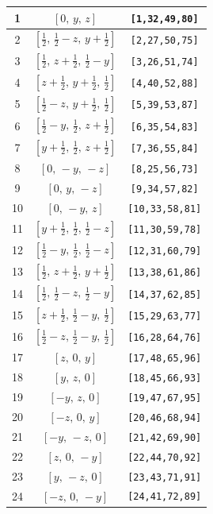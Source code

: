 \documentclass[fleqn,8pt]{jsarticle}
\begin{document}
\begin{longtable}{ccc}
1 & $\left[ 0,\, y,\, z \right]$ & {\tt [1,32,49,80]} \\ \hline
2 & $\left[ \frac{1}{2},\, \frac{1}{2} - z,\, y + \frac{1}{2} \right]$ & {\tt [2,27,50,75]} \\ \hline
3 & $\left[ \frac{1}{2},\, z + \frac{1}{2},\, \frac{1}{2} - y \right]$ & {\tt [3,26,51,74]} \\ \hline
4 & $\left[ z + \frac{1}{2},\, y + \frac{1}{2},\, \frac{1}{2} \right]$ & {\tt [4,40,52,88]} \\ \hline
5 & $\left[ \frac{1}{2} - z,\, y + \frac{1}{2},\, \frac{1}{2} \right]$ & {\tt [5,39,53,87]} \\ \hline
6 & $\left[ \frac{1}{2} - y,\, \frac{1}{2},\, z + \frac{1}{2} \right]$ & {\tt [6,35,54,83]} \\ \hline
7 & $\left[ y + \frac{1}{2},\, \frac{1}{2},\, z + \frac{1}{2} \right]$ & {\tt [7,36,55,84]} \\ \hline
8 & $\left[ 0,\, - y,\, - z \right]$ & {\tt [8,25,56,73]} \\ \hline
9 & $\left[ 0,\, y,\, - z \right]$ & {\tt [9,34,57,82]} \\ \hline
10 & $\left[ 0,\, - y,\, z \right]$ & {\tt [10,33,58,81]} \\ \hline
11 & $\left[ y + \frac{1}{2},\, \frac{1}{2},\, \frac{1}{2} - z \right]$ & {\tt [11,30,59,78]} \\ \hline
12 & $\left[ \frac{1}{2} - y,\, \frac{1}{2},\, \frac{1}{2} - z \right]$ & {\tt [12,31,60,79]} \\ \hline
13 & $\left[ \frac{1}{2},\, z + \frac{1}{2},\, y + \frac{1}{2} \right]$ & {\tt [13,38,61,86]} \\ \hline
14 & $\left[ \frac{1}{2},\, \frac{1}{2} - z,\, \frac{1}{2} - y \right]$ & {\tt [14,37,62,85]} \\ \hline
15 & $\left[ z + \frac{1}{2},\, \frac{1}{2} - y,\, \frac{1}{2} \right]$ & {\tt [15,29,63,77]} \\ \hline
16 & $\left[ \frac{1}{2} - z,\, \frac{1}{2} - y,\, \frac{1}{2} \right]$ & {\tt [16,28,64,76]} \\ \hline
17 & $\left[ z,\, 0,\, y \right]$ & {\tt [17,48,65,96]} \\ \hline
18 & $\left[ y,\, z,\, 0 \right]$ & {\tt [18,45,66,93]} \\ \hline
19 & $\left[ - y,\, z,\, 0 \right]$ & {\tt [19,47,67,95]} \\ \hline
20 & $\left[ - z,\, 0,\, y \right]$ & {\tt [20,46,68,94]} \\ \hline
21 & $\left[ - y,\, - z,\, 0 \right]$ & {\tt [21,42,69,90]} \\ \hline
22 & $\left[ z,\, 0,\, - y \right]$ & {\tt [22,44,70,92]} \\ \hline
23 & $\left[ y,\, - z,\, 0 \right]$ & {\tt [23,43,71,91]} \\ \hline
24 & $\left[ - z,\, 0,\, - y \right]$ & {\tt [24,41,72,89]} \\
\end{longtable}
\end{document}
